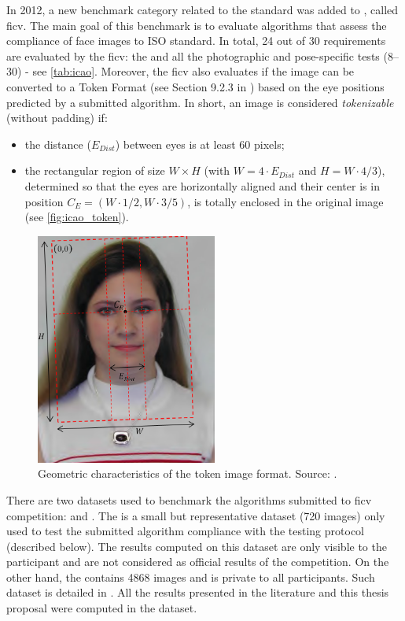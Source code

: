 In 2012, a new benchmark category related to the \icao standard was added to \fvcongoing \citep{ferrara2012face}, called \acf{ficv}. The main goal of this benchmark is to evaluate algorithms that assess the compliance of face images to ISO standard. In total, 24 out of 30 requirements are evaluated by the \acs{ficv}: the \eyecenterlocation and all the photographic and pose-specific tests (8--30) - see \autoref{tab:icao}. Moreover, the \acs{ficv} also evaluates if the image can be converted to a Token Format (see Section 9.2.3 in \citep{iso-iec}) based on the eye positions predicted by a submitted algorithm. In short, an image is considered \textit{tokenizable} (without padding) if:

\begin{itemize}
\item the distance ($E_{Dist}$) between eyes is at least 60 pixels;
\item the rectangular region of size $W \times H$ (with $W=4\cdot E_{Dist}$ and $H=W \cdot 4/3$), determined so that the eyes are horizontally aligned and their center is in position $C_E=(W\cdot1/2,W\cdot3/5)$, is totally enclosed in the original image (see \autoref{fig:icao_token}).
\end{itemize}

\begin{figure}[ht]
    \centering
    \includegraphics[height=3.0in]{images/icao_tokenizable.png}
    \caption{Geometric characteristics of the token image format. Source: \citep{fvcongoing}.}
    \label{fig:icao_token}
\end{figure}

There are two datasets used to benchmark the algorithms submitted to \acs{ficv} competition: \ficvtest and \ficvofficial. The \ficvtest is a small but representative dataset (720 images) only used to test the submitted algorithm compliance with the testing protocol (described below). The results computed on this dataset are only visible to the participant and are not considered as official results of the competition. On the other hand, the \ficvofficial contains 4868 images and is private to all participants. Such dataset is detailed in \cite{ferrara2012face}. All the results presented in the literature and this thesis proposal were computed in the \ficvofficial dataset.

